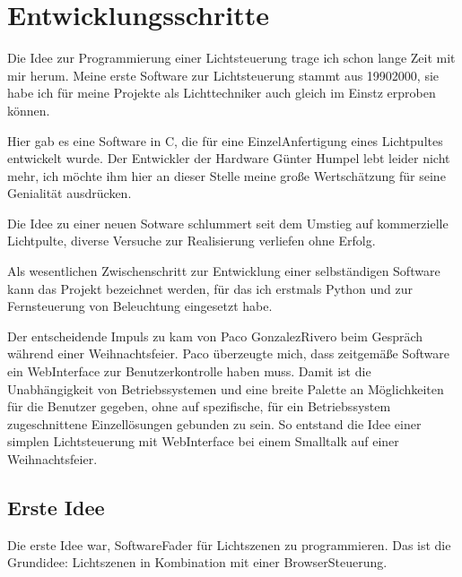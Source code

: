 \documentclass[letterpaper,10pt,ngerman]{sphinxmanual}
\begin{document}
\begin{sphinxVerbatim}[commandchars=\\\{\}]
  
 
\end{sphinxVerbatim}


\chapter{Entwicklungsschritte}
\label{\detokenize{history:entwicklungsschritte}}\label{\detokenize{history:history-label}}\label{\detokenize{history::doc}}
Die Idee zur Programmierung einer Lichtsteuerung trage ich schon lange Zeit
mit mir herum. Meine erste Software zur Lichtsteuerung stammt aus 1990\sphinxhyphen{}2000,
sie habe ich für meine Projekte als Lichttechniker auch gleich im Einstz
erproben können.

Hier gab es eine Software in C, die für eine Einzel\sphinxhyphen{}Anfertigung eines
Lichtpultes entwickelt wurde. Der Entwickler der Hardware Günter Humpel
lebt leider nicht mehr, ich möchte ihm hier an dieser Stelle meine
große Wertschätzung für seine Genialität ausdrücken.

Die Idee zu einer neuen Sotware schlummert seit dem Umstieg auf
kommerzielle Lichtpulte, diverse Versuche zur Realisierung verliefen
ohne Erfolg.

Als wesentlichen Zwischenschritt zur Entwicklung einer selbständigen
Software kann das Projekt  bezeichnet werden, für das ich
erstmals Python und
zur Fernsteuerung von Beleuchtung eingesetzt habe.

Der entscheidende Impuls zu  kam von Paco Gonzalez\sphinxhyphen{}Rivero beim
Gespräch während einer Weihnachtsfeier. Paco überzeugte mich, dass
zeitgemäße Software ein Web\sphinxhyphen{}Interface zur Benutzerkontrolle haben muss.
Damit ist die Unabhängigkeit von Betriebssystemen und eine
breite Palette an Möglichkeiten für die Benutzer gegeben, ohne auf
spezifische, für ein Betriebssystem zugeschnittene Einzellösungen
gebunden zu sein.
So entstand die Idee einer simplen Lichtsteuerung mit Web\sphinxhyphen{}Interface
bei einem Smalltalk auf einer Weihnachtsfeier.


\section{Erste Idee}
\label{\detokenize{history:erste-idee}}
Die erste Idee war, Software\sphinxhyphen{}Fader für Lichtszenen zu programmieren.
Das ist die Grundidee: Lichtszenen in Kombination mit einer
Browser\sphinxhyphen{}Steuerung.
\end{document}
